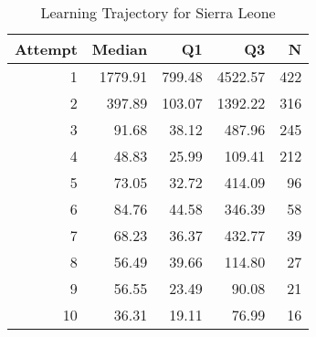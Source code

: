 \begin{table}[htbp]
\centering
\caption{Learning Trajectory for Sierra Leone}
\label{tab:learning-trajectory}
\begin{tabular}{rrrrr}
\toprule
Attempt & Median & Q1 & Q3 & N \\
\midrule
1 & 1779.91 & 799.48 & 4522.57 & 422 \\
2 & 397.89 & 103.07 & 1392.22 & 316 \\
3 & 91.68 & 38.12 & 487.96 & 245 \\
4 & 48.83 & 25.99 & 109.41 & 212 \\
5 & 73.05 & 32.72 & 414.09 & 96 \\
6 & 84.76 & 44.58 & 346.39 & 58 \\
7 & 68.23 & 36.37 & 432.77 & 39 \\
8 & 56.49 & 39.66 & 114.80 & 27 \\
9 & 56.55 & 23.49 & 90.08 & 21 \\
10 & 36.31 & 19.11 & 76.99 & 16 \\
\bottomrule
\end{tabular}
\end{table}